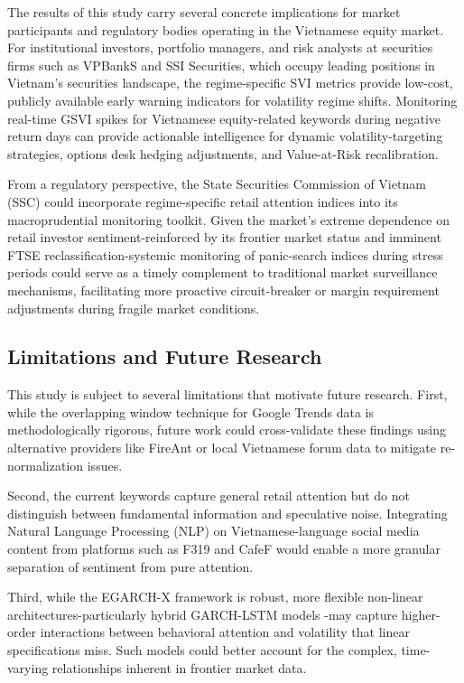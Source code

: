 \documentclass[12pt, a4paper]{article}
\begin{document}
The results of this study carry several concrete implications for market participants and regulatory bodies operating in the Vietnamese equity market. For institutional investors, portfolio managers, and risk analysts at securities firms such as VPBankS and SSI Securities, which occupy leading positions in Vietnam's securities landscape, the regime-specific SVI metrics provide low-cost, publicly available early warning indicators for volatility regime shifts. Monitoring real-time GSVI spikes for Vietnamese equity-related keywords during negative return days can provide actionable intelligence for dynamic volatility-targeting strategies, options desk hedging adjustments, and Value-at-Risk recalibration.

From a regulatory perspective, the State Securities Commission of Vietnam (SSC) could incorporate regime-specific retail attention indices into its macroprudential monitoring toolkit. Given the market's extreme dependence on retail investor sentiment-reinforced by its frontier market status and imminent FTSE reclassification-systemic monitoring of panic-search indices during stress periods could serve as a timely complement to traditional market surveillance mechanisms, facilitating more proactive circuit-breaker or margin requirement adjustments during fragile market conditions.

\subsection{Limitations and Future Research}

This study is subject to several limitations that motivate future research. First, while the overlapping window technique for Google Trends data is methodologically rigorous, future work could cross-validate these findings using alternative providers like FireAnt or local Vietnamese forum data to mitigate re-normalization issues.

Second, the current keywords capture general retail attention but do not distinguish between fundamental information and speculative noise. Integrating Natural Language Processing (NLP) on Vietnamese-language social media content from platforms such as F319 and CafeF would enable a more granular separation of sentiment from pure attention.

Third, while the EGARCH-X framework is robust, more flexible non-linear architectures-particularly hybrid GARCH-LSTM models \citep{kim2018}-may capture higher-order interactions between behavioral attention and volatility that linear specifications miss. Such models could better account for the complex, time-varying relationships inherent in frontier market data.
\end{document}
